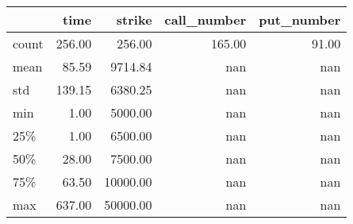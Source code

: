 \begin{tabular}{lrrrr}
\toprule
{} &   time &   strike &  call\_number &  put\_number \\
\midrule
count & 256.00 &   256.00 &       165.00 &       91.00 \\
mean  &  85.59 &  9714.84 &          nan &         nan \\
std   & 139.15 &  6380.25 &          nan &         nan \\
min   &   1.00 &  5000.00 &          nan &         nan \\
25\%   &   1.00 &  6500.00 &          nan &         nan \\
50\%   &  28.00 &  7500.00 &          nan &         nan \\
75\%   &  63.50 & 10000.00 &          nan &         nan \\
max   & 637.00 & 50000.00 &          nan &         nan \\
\bottomrule
\end{tabular}

